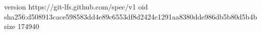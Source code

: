 version https://git-lfs.github.com/spec/v1
oid sha256:d508913cace598583dd4e89c6553df8d2424c1291aa8380dde986db5b80d5b4b
size 174940
